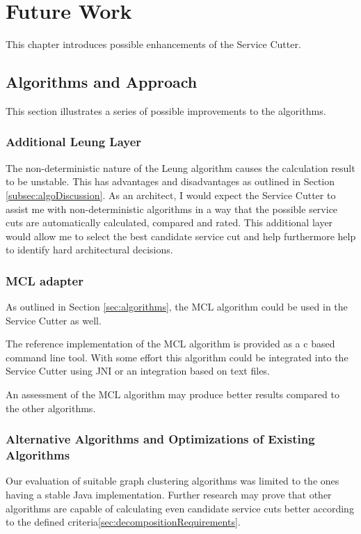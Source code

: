 \chapter{Future Work}
\label{cha:futureWork}

This chapter introduces possible enhancements of the Service Cutter. 

\section{Algorithms and Approach}

This section illustrates a series of possible improvements to the algorithms.

\subsection{Additional Leung Layer}

The non-deterministic nature of the Leung algorithm causes the calculation result to be unstable. This has advantages and disadvantages as outlined in Section \ref{subsec:algoDiscussion}. As an architect, I would expect the Service Cutter to assist me with non-deterministic algorithms in a way that the possible service cuts are automatically calculated, compared and rated. This additional layer would allow me to select the best candidate service cut and help furthermore help to identify hard architectural decisions.

\subsection{MCL adapter}
\label{subsec:mclAdapter}

As outlined in Section \ref{sec:algorithms}, the MCL algorithm could be used in the Service Cutter as well.

The reference implementation of the MCL algorithm is provided as a \gls{c} based command line tool. With some effort this algorithm could be integrated into the Service Cutter using \gls{JNI} or an integration based on text files.

An assessment of the MCL algorithm may produce better results compared to the other algorithms.

\subsection{Alternative Algorithms and Optimizations of Existing Algorithms}

Our evaluation of suitable graph clustering algorithms was limited to the ones having a stable Java implementation. Further research may prove that other algorithms are capable of calculating even candidate service cuts better according to the defined criteria\ref{sec:decompositionRequirements}.

